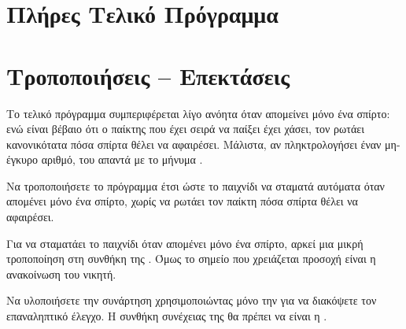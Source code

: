 \documentclass[a4paper,11pt,oneside]{book}
\begin{document}
{{{%

\vspace{-12pt}
\section{Πλήρες Τελικό Πρόγραμμα}



\section{Τροποποιήσεις -- Επεκτάσεις}

\begin{exercise}
Το τελικό πρόγραμμα συμπεριφέρεται λίγο ανόητα όταν απομείνει μόνο ένα σπίρτο: ενώ είναι βέβαιο ότι ο παίκτης που έχει σειρά να παίξει έχει χάσει, τον ρωτάει κανονικότατα πόσα σπίρτα θέλει να αφαιρέσει. Μάλιστα, αν πληκτρολογήσει έναν μη-έγκυρο αριθμό, του απαντά με το μήνυμα . 

Να τροποποιήσετε το πρόγραμμα έτσι ώστε το παιχνίδι να σταματά αυτόματα όταν απομένει μόνο ένα σπίρτο, χωρίς να ρωτάει τον παίκτη πόσα σπίρτα θέλει να αφαιρέσει. 

\begin{note}
Για να σταματάει το παιχνίδι όταν απομένει μόνο ένα σπίρτο, αρκεί μια μικρή τροποποίηση στη συνθήκη της . Όμως το σημείο που χρειάζεται προσοχή είναι η ανακοίνωση του νικητή.
\end{note}
\end{exercise}

\begin{exercise}
Να υλοποιήσετε την συνάρτηση  χρησιμοποιώντας μόνο την  για να διακόψετε τον επαναληπτικό έλεγχο. Η συνθήκη συνέχειας της  θα πρέπει να είναι η .
\end{exercise}

}}}
\end{document}
